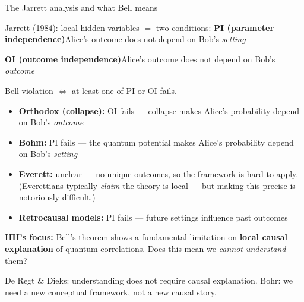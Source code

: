 \documentclass[fleql]{beamer}
\newcommand{\kw}[1]{\textbf{#1}}
\begin{document}
\begin{frame}{The Jarrett analysis and what Bell means}

  Jarrett (1984): local hidden variables $=$ two conditions:
  \textbf{PI (parameter independence)}\enspace Alice's outcome
  does not depend on Bob's \emph{setting}

  \smallskip

  \textbf{OI (outcome independence)}\enspace Alice's outcome
  does not depend on Bob's \emph{outcome}

  Bell violation $\Leftrightarrow$ at least one of PI or OI fails.
  \begin{itemize}
  \item \textbf{Orthodox (collapse):} OI fails --- collapse makes
    Alice's probability depend on Bob's \emph{outcome}
  \item \textbf{Bohm:} PI fails --- the quantum potential makes
    Alice's probability depend on Bob's \emph{setting}
  \item \textbf{Everett:} unclear --- no unique outcomes,
    so the framework is hard to apply. (Everettians
    typically \emph{claim} the theory is local --- but
    making this precise is notoriously difficult.)
  \item \textbf{Retrocausal models:} PI fails --- future settings
    influence past outcomes
  \end{itemize}

  \vspace{0.5em}
  \textbf{HH's focus:} Bell's theorem shows a fundamental
  limitation on \kw{local causal explanation} of quantum
  correlations. Does this mean we \emph{cannot understand} them?

  \vspace{0.3em}
  \small De Regt \& Dieks: understanding does not require causal
  explanation. Bohr: we need a new conceptual framework,
  not a new causal story.

\end{frame}
\end{document}
